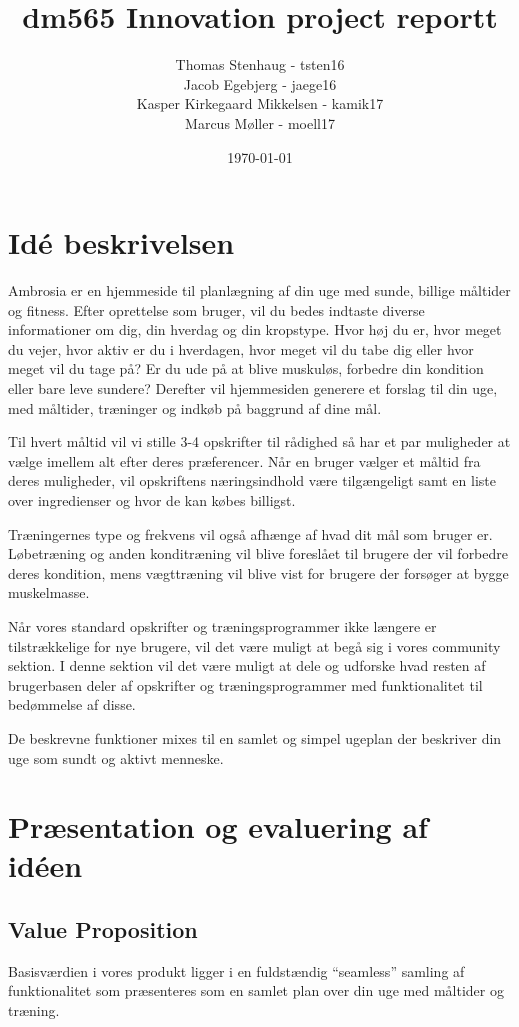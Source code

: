 \documentclass{article}
\title{dm565 Innovation project reportt}
\author{Thomas Stenhaug - tsten16 \\ Jacob Egebjerg - jaege16 \\ Kasper Kirkegaard Mikkelsen - kamik17 \\Marcus Møller - moell17 }
\date{\today}
\begin{document}
\maketitle

\section{Idé beskrivelsen}
Ambrosia er en hjemmeside til planlægning af din uge med sunde, billige måltider og fitness. Efter oprettelse som bruger, vil du bedes indtaste diverse informationer om dig, din hverdag og din kropstype. Hvor høj du er, hvor meget du vejer, hvor aktiv er du i hverdagen, hvor meget vil du tabe dig eller hvor meget vil du tage på? Er du ude på at blive muskuløs, forbedre din kondition eller bare leve sundere? Derefter vil hjemmesiden generere et forslag til din uge, med måltider, træninger og indkøb på baggrund af dine mål. 

Til hvert måltid vil vi stille 3-4 opskrifter til rådighed så har et par muligheder at vælge imellem alt efter deres præferencer. Når en bruger vælger et måltid fra deres muligheder, vil opskriftens næringsindhold være tilgængeligt samt en liste over ingredienser og hvor de kan købes billigst. 

Træningernes type og frekvens vil også afhænge af hvad dit mål som bruger er. Løbetræning og anden konditræning vil blive foreslået til brugere der vil forbedre deres kondition, mens vægttræning vil blive vist for brugere der forsøger at bygge muskelmasse. 

Når vores standard opskrifter og træningsprogrammer ikke længere er tilstrækkelige for nye brugere, vil det være muligt at begå sig i vores community sektion. I denne sektion vil det være muligt at dele og udforske hvad resten af brugerbasen deler af opskrifter og træningsprogrammer med funktionalitet til bedømmelse af disse. 

De beskrevne funktioner mixes til en samlet og simpel ugeplan der beskriver din uge som sundt og aktivt menneske.

\newpage
\section{Præsentation og evaluering af idéen}

\subsection{Value Proposition}
Basisværdien i vores produkt ligger i en fuldstændig “seamless” samling af funktionalitet som præsenteres som en samlet plan over din uge med måltider og træning. 
\end{document}
